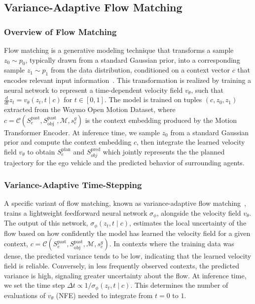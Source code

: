 \documentclass[conference]{IEEEtran}
\begin{document}
\subsection{Variance-Adaptive Flow Matching}
\subsubsection*{Overview of Flow Matching}
Flow matching is a generative modeling technique that transforms a sample \(z_0 \sim p_0\), typically drawn from a standard Gaussian prior, into a corresponding sample \(z_1 \sim p_1\) from the data distribution, conditioned on a context vector \(c\) that encodes relevant input information~\cite{basic_flow_matching}. This transformation is realized by training a neural network to represent a time-dependent velocity field \(v_\theta\), such that \(\frac{d}{dt} z_t = v_\theta(z_t, t \mid c)\) for \(t \in [0, 1]\). The model is trained on tuples \((c, z_0, z_1)\) extracted from the Waymo Open Motion Dataset, where \(c = \mathcal{C}(S^{\text{past}}_e, S^{\text{past}}_{\text{obj}}, \mathcal{M}, s^g_e)\) is the context embedding produced by the Motion Transformer Encoder. At inference time, we sample \(z_0\) from a standard Gaussian prior and compute the context embedding \(c\), then integrate the learned velocity field \(v_\theta\) to obtain \(S^{\text{plan}}_e\) and  \(S^\text{pred}_{obj}\)  which jointly represents the the planned trajectory for the ego vehicle and the predicted behavior of surrounding agents.


\subsubsection*{Variance-Adaptive Time-Stepping}

A specific variant of flow matching, known as variance-adaptive flow matching~\cite{adaflow}, trains a lightweight feedforward neural network \(\sigma_\phi\), alongside the velocity field \(v_\theta\). The output of this network, \(\sigma_\phi(z_t,t\mid c)\), estimates the local uncertainty of the flow based on how confidently the model has learned the velocity field for a given context, \( c = \mathcal{C}(S^{\text{past}}_e, S^{\text{past}}_{\text{obj}}, \mathcal{M},s^g_e)\). In contexts where the training data was dense, the predicted variance tends to be low, indicating that the learned velocity field is reliable. Conversely, in less frequently observed contexts, the predicted variance is high, signaling greater uncertainty about the flow. At inference time, we set the time step $\Delta t \propto 1/\sigma_{\phi}(z_t, t \mid c)$. This determines the number of evaluations of $v_{\theta}$ (NFE) needed to integrate from $t = 0$ to $1$.
\end{document}
